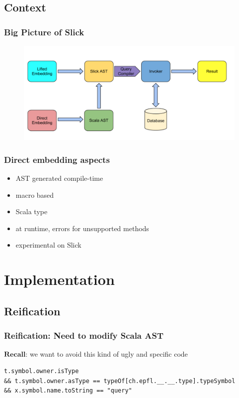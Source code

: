 \documentclass{beamer}
\begin{document}
\subsection{Context}

\begin{frame}
\frametitle{Big Picture of Slick}

\begin{figure}
\includegraphics[width=0.8\linewidth]{./img/bigp.png}
\end{figure}

\end{frame}



\begin{frame}
\frametitle{Direct embedding aspects}

\begin{itemize}
\item AST generated compile-time 
\item macro based
\item Scala type
\item at runtime, errors for unsupported methods
\item  experimental on Slick
\end{itemize}

\end{frame}

\section{Implementation}
\subsection{Reification}

\begin{frame}[fragile]
\frametitle{Reification: Need to modify Scala AST}

$\mathbf{Recall}$: we want to avoid this kind of ugly and specific code
\begin{lstlisting}
t.symbol.owner.isType
&& t.symbol.owner.asType == typeOf[ch.epfl.__.__.type].typeSymbol
&& x.symbol.name.toString == "query"
\end{lstlisting}


\end{frame}
\end{document}
